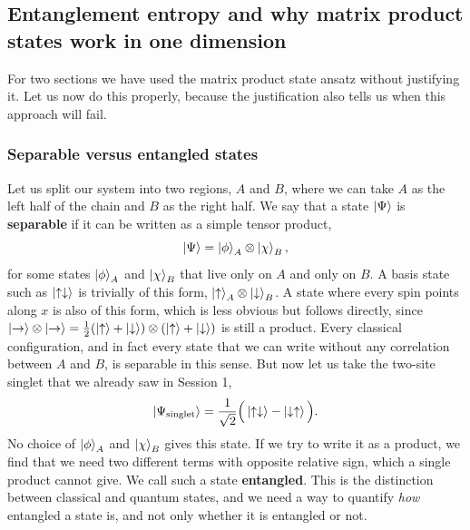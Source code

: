 \documentclass[lecture_notes.tex]{subfiles}
\begin{document}
\subsection{Entanglement entropy and why matrix product states work in one dimension}
\label{sec:entanglement}
For two sections we have used the matrix product state ansatz without justifying it. Let us now do
this properly, because the justification also tells us when this approach will fail.

\subsubsection{Separable versus entangled states}
Let us split our system into two regions, $A$ and $B$, where we can take $A$ as the left half
of the chain and $B$ as the right half. We say that a state $\ket{\Psi}$ is \textbf{separable} if
it can be written as a simple tensor product,
\begin{equation}
  \ket{\Psi} = \ket{\phi}_A \otimes \ket{\chi}_B,
\end{equation}
for some states $\ket{\phi}_A$ and $\ket{\chi}_B$ that live only on $A$ and only on $B$. A basis
state such as $\ket{\uparrow\downarrow}$ is trivially of this form, $\ket{\uparrow}_A\otimes\ket{\downarrow}_B$. A state
where every spin points along $x$ is also of this form, which is less obvious but follows
directly, since
$\ket{\to}\otimes\ket{\to} = \tfrac12(\ket{\uparrow}+\ket{\downarrow})\otimes(\ket{\uparrow}+\ket{\downarrow})$ is still a
product. Every classical configuration, and in fact every state that we can write without any
correlation between $A$ and $B$, is separable in this sense. But now let us take the two-site
singlet that we already saw in Session 1,
\begin{equation}
  \ket{\Psi_{\mathrm{singlet}}} = \frac{1}{\sqrt2}\Big(\ket{\uparrow\downarrow} - \ket{\downarrow\uparrow}\Big).
\end{equation}
No choice of $\ket{\phi}_A$ and $\ket{\chi}_B$ gives this state. If we try to write it as a
product, we find that we need two different terms with opposite relative sign, which a single
product cannot give. We call such a state \textbf{entangled}. This is the distinction between
classical and quantum states, and we need a way to quantify \emph{how} entangled a state is, and
not only whether it is entangled or not.
\end{document}
